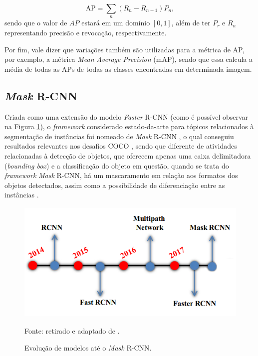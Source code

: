 \begin{equation}
    \label{instance:eq:1}
    \text{AP} = \sum_n (R_n - R_{n-1}) P_n,
\end{equation}
sendo que o valor de $AP$ estará em um domínio $[0,1]$, além de ter $P_r$ e $R_n$ representando precisão e revocação, respectivamente.

Por fim, vale dizer que variações também são utilizadas para a métrica de AP, por exemplo, a métrica \textit{Mean Average Precision} (mAP), sendo que essa calcula a média de todas as APs de todas as classes encontradas em determinada imagem.


\subsection{\textit{Mask} R-CNN}
\label{instance:mask}

Criada como uma extensão do modelo \textit{Faster} R-CNN \cite{Ren2017} (como é possível observar na Figura \ref{instance:fig:5}), o \textit{framework} considerado estado-da-arte para tópicos relacionados à segmentação de instâncias foi nomeado de \textit{Mask} R-CNN \cite{He2020}, o qual conseguiu resultados relevantes nos desafios COCO \cite{Lin2016}, sendo que diferente de atividades relacionadas à detecção de objetos, que oferecem apenas uma caixa delimitadora (\textit{bounding box}) e a classificação do objeto em questão, quando se trata do \textit{framework} \textit{Mask} R-CNN, há um mascaramento em relação aos formatos dos objetos detectados, assim como a possibilidade de diferenciação entre as instâncias \cite{Hafiz2020}.

\begin{figure}[H]
    \centering
    \caption{Evolução de modelos até o \textit{Mask} R-CNN.}
    \includegraphics[height=2.3in]{recursos/imagens/instance/mask_rcnn_evol.png}
    \label{instance:fig:5}

    Fonte: retirado e adaptado de \cite{Hafiz2020}.
\end{figure}

